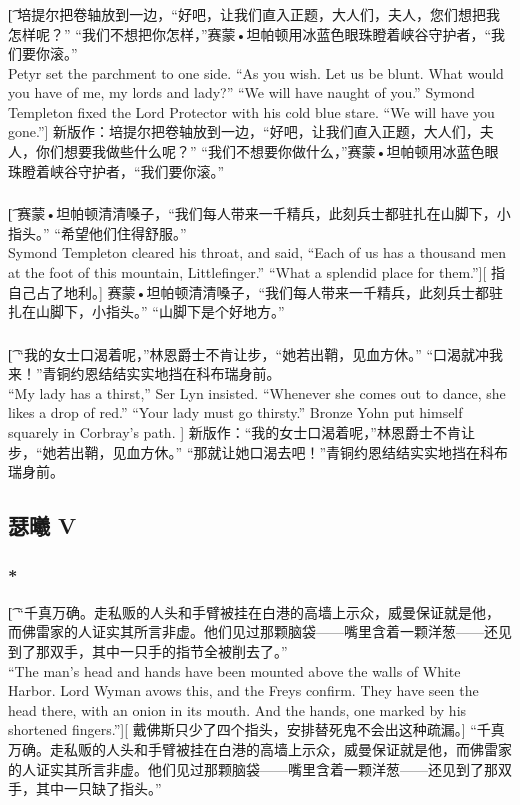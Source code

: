 \documentclass[12pt,a4paper]{article}
\begin{document}
\subsubsection{}\t[
	培提尔把卷轴放到一边，“好吧，让我们直入正题，大人们，夫人，您们想把我怎样呢？” “我们不想把你怎样，”赛蒙•坦帕顿用冰蓝色眼珠瞪着峡谷守护者，“我们要你滚。” \\
	Petyr set the parchment to one side. “As you wish. Let us be blunt. What would you have of me, my lords and lady?” “We will have naught of you.” Symond Templeton fixed the Lord Protector with his cold blue stare. “We will have you gone.”]
	新版作：培提尔把卷轴放到一边，“好吧，让我们直入正题，大人们，夫人，你们想要我做些什么呢？”  “我们不想要你做什么，”赛蒙•坦帕顿用冰蓝色眼珠瞪着峡谷守护者，“我们要你滚。”
	
\subsubsection{}\t[
	赛蒙•坦帕顿清清嗓子，“我们每人带来一千精兵，此刻兵士都驻扎在山脚下，小指头。” “希望他们住得舒服。” \\
	Symond Templeton cleared his throat, and said, “Each of us has a thousand men at the foot of this mountain, Littlefinger.” “What a splendid place for them.”][
	指自己占了地利。]
	赛蒙•坦帕顿清清嗓子，“我们每人带来一千精兵，此刻兵士都驻扎在山脚下，小指头。” “山脚下是个好地方。” 
	
\subsubsection{}\t[
	 “我的女士口渴着呢，”林恩爵士不肯让步，“她若出鞘，见血方休。” “口渴就冲我来！”青铜约恩结结实实地挡在科布瑞身前。\\
	 “My lady has a thirst,” Ser Lyn insisted. “Whenever she comes out to dance, she likes a drop of red.” “Your lady must go thirsty.” Bronze Yohn put himself squarely in Corbray's path. ]
	 新版作：“我的女士口渴着呢，”林恩爵士不肯让步，“她若出鞘，见血方休。” “那就让她口渴去吧！”青铜约恩结结实实地挡在科布瑞身前。
	 
\subsection{瑟曦 V}
\subsubsection{\color{red}*}\t[
	“千真万确。走私贩的人头和手臂被挂在白港的高墙上示众，威曼保证就是他，而佛雷家的人证实其所言非虚。他们见过那颗脑袋——嘴里含着一颗洋葱——还见到了那双手，其中一只手的指节全被削去了。”\\
	“The man's head and hands have been mounted above the walls of White Harbor. Lord Wyman avows this, and the Freys confirm. They have seen the head there, with an onion in its mouth. And the hands, one marked by his shortened fingers.”][
	戴佛斯只少了四个指头，安排替死鬼不会出这种疏漏。]
	“千真万确。走私贩的人头和手臂被挂在白港的高墙上示众，威曼保证就是他，而佛雷家的人证实其所言非虚。他们见过那颗脑袋——嘴里含着一颗洋葱——还见到了那双手，其中一只缺了指头。”
\end{document}
